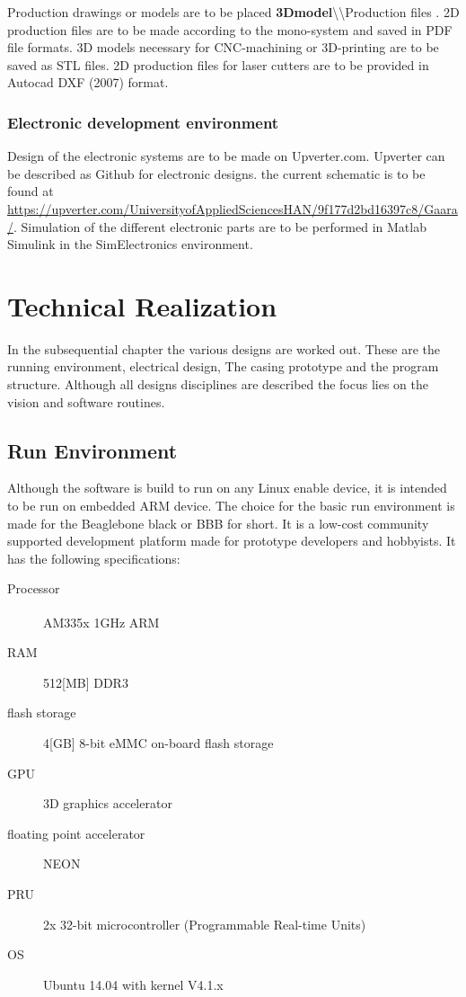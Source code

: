 \documentclass[11pt,fleqn,,a4paper,twoside,openright]{book}
\begin{document}
Production drawings or models are to be placed \textbf{3Dmodel}\textbackslash<Release name>\textbackslash Production files . 2D production files are to be made according to the mono-system and saved in PDF file formats. 3D models necessary for CNC-machining or 3D-printing are to be saved as STL files. 2D production files for laser cutters are to be provided in Autocad DXF (2007) format.

\subsection{Electronic development environment}
Design of the electronic systems are to be made on Upverter.com. Upverter can be described as Github for electronic designs. the current schematic is to be found at \url{https://upverter.com/UniversityofAppliedSciencesHAN/9f177d2bd16397c8/Gaara/}. Simulation of the different electronic parts are to be performed in Matlab Simulink in the SimElectronics environment.

\chapter{Technical Realization}\label{chap:TechnicalRealization}
In the subsequential chapter the various designs are worked out. These are the running environment, electrical design, The casing prototype and the program structure. Although all designs disciplines are described the focus lies on the vision and software routines.

\section{Run Environment}\label{RunEnvironment}
Although the software is build to run on any Linux enable device, it is intended to be run on embedded ARM device. The choice for the basic run environment is made for the Beaglebone black or BBB for short. It is a low-cost community supported development platform made for prototype developers and hobbyists. It has the following specifications:
\begin{description}
	\item[Processor] AM335x 1GHz ARM\textsuperscript{\textregistered}
	\item[RAM] 512[MB] DDR3
	\item[flash storage] 4[GB] 8-bit eMMC on-board flash storage
	\item[GPU] 3D graphics accelerator
	\item[floating point accelerator] NEON
	\item[PRU] 2x 32-bit microcontroller (Programmable Real-time Units)
	\item[OS] Ubuntu 14.04 with kernel V4.1.x
\end{description}
\end{document}
